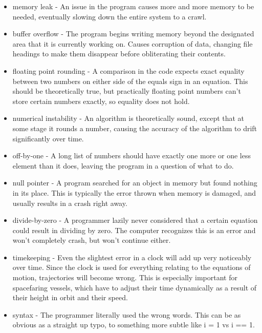 \documentclass[a4paper]{article}
\begin{document}
\begin{minipage}[t]{0.45\linewidth}
\begin{itemize}[leftmargin=0cm]
\item memory leak - An issue in the program causes more and more memory to be needed, eventually slowing down the entire system to a crawl.
\item buffer overflow - The program begins writing memory beyond the designated area that it is currently working on. Causes corruption of data, changing file headings to make them disappear before obliterating their contents.
\item floating point rounding - A comparison in the code expects exact equality between two numbers on either side of the equals sign in an equation. This should be theoretically true, but practically floating point numbers can't store certain numbers exactly, so equality does not hold. 
\item numerical instability - An algorithm is theoretically sound, except that at some stage it rounds a number, causing the accuracy of the algorithm to drift significantly over time.
\item off-by-one - A long list of numbers should have exactly one more or one less element than it does, leaving the program in a question of what to do. 
\end{itemize}
\end{minipage}
\begin{minipage}[t]{0.5\linewidth}
\begin{itemize}[leftmargin=0.5cm]
\item null pointer - A program searched for an object in memory but found nothing in its place. This is typically the error thrown when memory is damaged, and usually results in a crash right away.
\item divide-by-zero - A programmer lazily never considered that a certain equation could result in dividing by zero. The computer recognizes this is an error and won't completely crash, but won't continue either.
\item timekeeping - Even the slightest error in a clock will add up very noticeably over time. Since the clock is used for everything relating to the equations of motion, trajectories will become wrong. This is especially important for spacefaring vessels, which have to adjust their time dynamically as a result of their height in orbit and their speed. 
\item syntax - The programmer literally used the wrong words. This can be as obvious as a straight up typo, to something more subtle like i = 1 vs i == 1.
\end{itemize}
\end{minipage}
\end{document}
